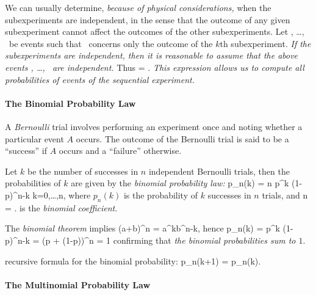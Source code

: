 	\item
	We can usually determine, \emph{because of physical considerations,}
	when the subexperiments are independent,
	in the sense that the outcome of any given subexperiment
	cannot affect the outcomes of the other subexperiments.
	Let , \ldots, \ be events such that \ concerns
	only the outcome of the $k$th subexperiment.
	\emph{If the subexperiments are independent,
	then it is reasonable to assume that
	the above events , \ldots, \ are independent.}
	Thus
	\beq
		 =  \cdots {}.
	\eeq
	\emph{This expression allows us to compute all probabilities
	of events of the sequential experiment.}

\eit

\paragraph{The Binomial Probability Law}
\bit
	\item A \emph{Bernoulli} trial involves performing an experiment once and noting
	whether a particular event $A$ occurs.
	The outcome of the Bernoulli trial is said to be
	a ``success'' if $A$ occurs and a ``failure'' otherwise.


	\item
	Let $k$ be the number of successes in $n$ independent Bernoulli trials,
	then the probabilities of $k$ are given by the \emph{binomial probability law:}
		p_n(k) = {n } p^k (1-p)^{n-k}
		\mfor
		k=0,\ldots,n,
	\eeql
	where $p_n(k)$ is the probability of $k$ successes in $n$ trials,
	and
		{n } = .
	\eeql
	is the \emph{binomial coefficient}.

	\item The \emph{binomial theorem} implies
		(a+b)^n =  a^kb^{n-k},
	\eeql
	hence
	\beq
		\sumkton p_n(k)
		=  p^k (1-p)^{n-k}
		= (p + (1-p))^n = 1
	\eeq
	confirming that \emph{the binomial probabilities sum to $1$}.

	\item recursive formula for the binomial probability:
		p_n(k+1) =  p_n(k).
	\eeql

	\item {}
\eit

\paragraph{The Multinomial Probability Law}

